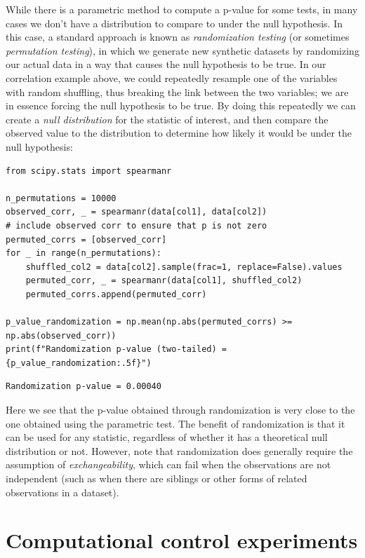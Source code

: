 While there is a parametric method to compute a p-value for some tests, in many cases we don't have a distribution to compare to under the null hypothesis.  In this case, a standard approach is known as \textit{randomization testing} (or sometimes \textit{permutation testing}), in which we generate new synthetic datasets by randomizing our actual data in a way that causes the null hypothesis to be true.  In our correlation example above, we could repeatedly resample one of the variables with random shuffling, thus breaking the link between the two variables; we are in essence forcing the null hypothesis to be true. By doing this repeatedly we can create a \textit{null distribution} for the statistic of interest, and then compare the observed value to the distribution to determine how likely it would be under the null hypothesis:

\begin{lstlisting}[style=Python]
from scipy.stats import spearmanr

n_permutations = 10000
observed_corr, _ = spearmanr(data[col1], data[col2])
# include observed corr to ensure that p is not zero
permuted_corrs = [observed_corr]
for _ in range(n_permutations):
    shuffled_col2 = data[col2].sample(frac=1, replace=False).values
    permuted_corr, _ = spearmanr(data[col1], shuffled_col2)
    permuted_corrs.append(permuted_corr)

p_value_randomization = np.mean(np.abs(permuted_corrs) >= np.abs(observed_corr))
print(f"Randomization p-value (two-tailed) = {p_value_randomization:.5f}")
\end{lstlisting}

\begin{lstlisting}[style=shellshort]
Randomization p-value = 0.00040
\end{lstlisting}

Here we see that the p-value obtained through randomization is very close to the one obtained using the parametric test.  The benefit of randomization is that it can be used for any statistic, regardless of whether it has a theoretical null distribution or not.  However, note that randomization does generally require the assumption of \textit{exchangeability}, which can fail when the observations are not independent (such as when there are siblings or other forms of related observations in a dataset).

\section{Computational control experiments}

